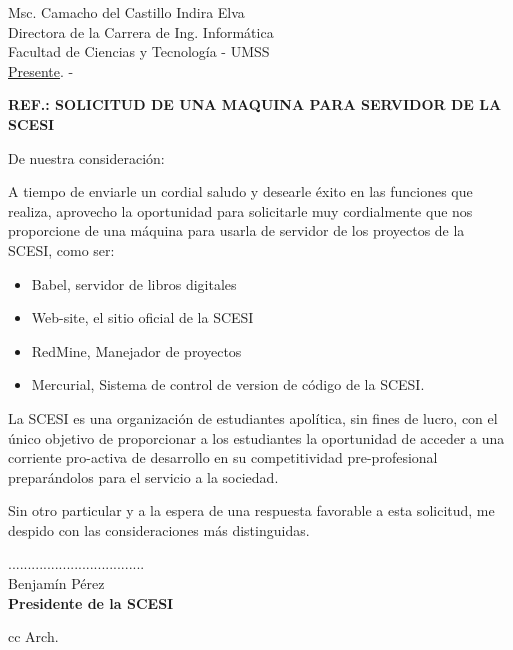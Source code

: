 \documentclass[letterpaper,12pt]{letter}
\begin{document}
\date {8 de diciembre de 2011}
\begin{letter}{Msc. Camacho del Castillo Indira Elva \\ Directora de la Carrera de Ing. Inform\'atica \\ Facultad de Ciencias y Tecnolog\'ia - UMSS \\ \underline {Presente}. -}

\begin{center}
	\opening{\textbf{REF.: SOLICITUD DE UNA MAQUINA PARA SERVIDOR DE LA SCESI}}
\end{center}

De nuestra consideración:

A tiempo de enviarle un cordial saludo y desearle éxito en las funciones que realiza, aprovecho la 
oportunidad para solicitarle muy cordialmente que nos proporcione de una m\'aquina para usarla de 
servidor de los proyectos de la SCESI, como ser:

\begin{itemize}
    \item Babel, servidor de libros digitales
    \item Web-site, el sitio oficial de la SCESI
    \item RedMine, Manejador de proyectos
    \item Mercurial, Sistema de control de version de c\'odigo de la SCESI.
\end{itemize}

La SCESI es una organización de estudiantes apolítica, sin fines de lucro, con el único objetivo de 
proporcionar a los estudiantes la oportunidad de acceder a una corriente pro-activa de desarrollo en su 
competitividad pre-profesional preparándolos para el servicio a la sociedad.

Sin otro particular y a la espera de una respuesta favorable a esta solicitud, me despido con las consideraciones más distinguidas.

\vspace{1cm}

\begin{center}
...................................\\
Benjam\'in P\'erez\\
{\bfseries Presidente de la  SCESI}
\end{center}
cc Arch.
\end{letter}
\end{document}
